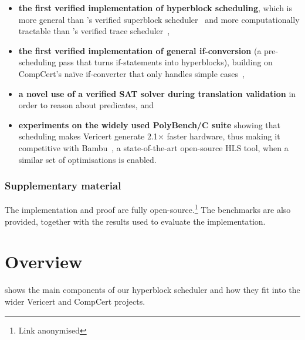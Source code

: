 \begin{itemize}
\item \textbf{the first verified implementation of hyperblock scheduling},
  which is more general than \citeauthor{six22_formal_verif_super_sched}'s verified superblock scheduler~\cite{six22_formal_verif_super_sched} and more computationally tractable than
  \citeauthor{tristan08_formal_verif_trans_valid}'s verified trace scheduler~\cite{tristan08_formal_verif_trans_valid},
\item \textbf{the first verified implementation of general if-conversion} (a
  pre-scheduling pass that turns if-statements into hyperblocks),
  building on CompCert's na\"ive if-converter that only
  handles simple cases~\cite{absint19_compc},
\item \textbf{a novel use of a verified SAT solver during translation validation} in order to reason about predicates, and
\item \textbf{experiments on the widely used PolyBench/C suite} showing that scheduling makes Vericert generate 2.1$\times$ faster hardware, thus making it competitive with Bambu~\cite{ferrandi2021bambu}, a state-of-the-art open-source HLS tool, when a similar set of optimisations is enabled.

\end{itemize}

\subsubsection*{Supplementary material}

The implementation and proof are fully open-source.\footnote{Link anonymised}  The benchmarks are also provided, together with the results used to evaluate the implementation.


\section{Overview}
\label{sec:overview}

 shows the main components of our hyperblock scheduler
and how they fit into the wider Vericert and CompCert projects.


